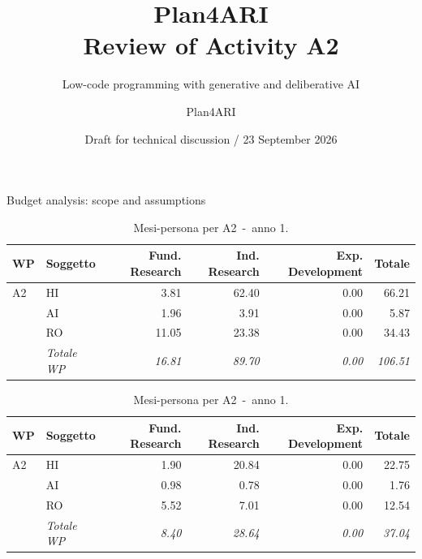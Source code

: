 \documentclass[aspectratio=169,10pt]{beamer}
\title[Plan4ARI / A2 Review]{Plan4ARI\\\large Review of Activity A2}
\subtitle{Low-code programming with generative and deliberative AI}
\author{Plan4ARI}
\institute{Methodological update and technical specification alignment}
\date{Draft for technical discussion / 23 September 2026}
\begin{document}
\begin{frame}
  \titlepage%
\end{frame}

\begin{frame}{Budget analysis: scope and assumptions}


\begin{table}[H]\centering\scriptsize\caption{Mesi-persona per Attività 2.}\label{tab:wp-w-tot}
\begin{tabular}{llrrrr}\toprule\textbf{WP} & \textbf{Soggetto} & \textbf{Fund. Research} & \textbf{Ind. Research} & \textbf{Exp. Development} & \textbf{Totale} \\\midrule
A2 & HI & 3.81 & 62.40 & 0.00 & 66.21 \\
 & AI & 1.96 & 3.91 & 0.00 & 5.87 \\
 & RO & 11.05 & 23.38 & 0.00 & 34.43 \\
 & \textit{Totale WP} & \textit{16.81} & \textit{89.70} & \textit{0.00} & \textit{106.51} \\\midrule
\bottomrule\end{tabular}
%  
\caption{Mesi-persona per A2~-~anno 1.}\label{tab:wp-w-y1}
\begin{tabular}{llrrrr}\toprule\textbf{WP} & \textbf{Soggetto} & \textbf{Fund. Research} & \textbf{Ind. Research} & \textbf{Exp. Development} & \textbf{Totale} \\\midrule
A2 & HI & 1.90 & 20.84 & 0.00 & 22.75 \\
 & AI & 0.98 & 0.78 & 0.00 & 1.76 \\
 & RO & 5.52 & 7.01 & 0.00 & 12.54 \\
 & \textit{Totale WP} & \textit{8.40} & \textit{28.64} & \textit{0.00} & \textit{37.04} \\\midrule
\bottomrule\end{tabular}
\end{table}
\end{frame}
\end{document}
